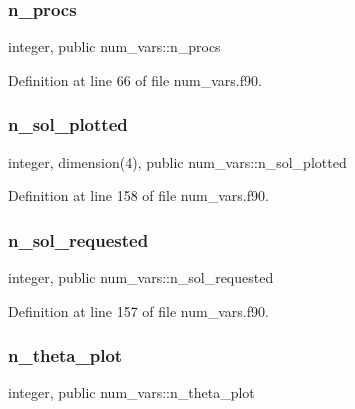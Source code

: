 \subsubsection{\texorpdfstring{n\+\_\+procs}{n\_procs}}
{\footnotesize\ttfamily integer, public num\+\_\+vars\+::n\+\_\+procs}



Definition at line 66 of file num\+\_\+vars.\+f90.

\mbox{\label{namespacenum__vars_a98df35edce5a42616685bb1ebd508c79}} 
\subsubsection{\texorpdfstring{n\+\_\+sol\+\_\+plotted}{n\_sol\_plotted}}
{\footnotesize\ttfamily integer, dimension(4), public num\+\_\+vars\+::n\+\_\+sol\+\_\+plotted}



Definition at line 158 of file num\+\_\+vars.\+f90.

\mbox{\label{namespacenum__vars_a3deb68d5c9cd3a99c9dd779e18c4d129}} 
\subsubsection{\texorpdfstring{n\+\_\+sol\+\_\+requested}{n\_sol\_requested}}
{\footnotesize\ttfamily integer, public num\+\_\+vars\+::n\+\_\+sol\+\_\+requested}



Definition at line 157 of file num\+\_\+vars.\+f90.

\mbox{\label{namespacenum__vars_a0c3d2a6eea73c4d47f30df016475b585}} 
\subsubsection{\texorpdfstring{n\+\_\+theta\+\_\+plot}{n\_theta\_plot}}
{\footnotesize\ttfamily integer, public num\+\_\+vars\+::n\+\_\+theta\+\_\+plot}



